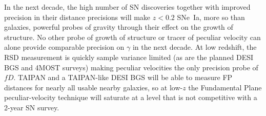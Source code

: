 \documentclass[11pt, oneside]{article}   	%
\begin{document}
In the next decade,
the high number of SN discoveries together with improved precision in their distance precisions will make $z<0.2$ SNe~Ia, more so than
galaxies,  powerful probes of gravity through their effect  on the growth of structure.  No other probe of growth of structure or tracer of peculiar velocity can alone provide comparable precision on  $\gamma$ in the next decade.
At low redshift, the RSD measurement is quickly sample variance limited (as are the planned DESI BGS and 4MOST surveys) making peculiar velocities the only 
precision probe of $fD$.
TAIPAN and a TAIPAN-like DESI BGS will be able to measure FP distances for nearly all usable nearby galaxies, so at low-$z$ the Fundamental Plane peculiar-velocity
technique will  saturate at a level that is not competitive with a  2-year SN survey.





\end{document}
